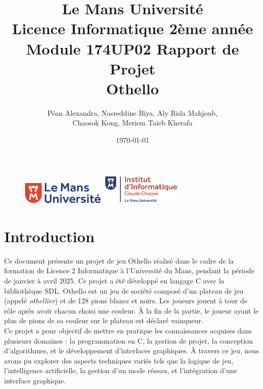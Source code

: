 \documentclass[12pt, a4paper, oneside]{article}
\begin{document}
\begin{figure}
    \includegraphics[width=4cm]{logolemansU.png}
    \hfill
    \includegraphics[width=4cm]{logo_IC2.png}
\end{figure}


\title{\color{blue}\textbf{Le Mans Université} \\
        \color{black} Licence Informatique 2ème année \\
       Module 174UP02 Rapport de Projet \\
       \textbf{Othello}}
\author{Péan Alexandra, Nasreddine Biya, Aly Rida Mahjoub, \\ Chaosok Kong, Meriem Taieb Kherafa}
\date{\today}

\maketitle

\newpage
\tableofcontents

\newpage

\section{Introduction}
   
Ce document présente un projet de jeu Othello réalisé dans le cadre de la 
    formation de Licence 2 Informatique à l’Université du Mans, pendant la 
    période de janvier à avril 2025. Ce projet a été développé en langage C avec 
    la bibliothèque SDL. Othello est un jeu de société composé d’un plateau de 
    jeu (appelé \textit{othellier}) et de 128 pions blancs et noirs. Les joueurs 
    jouent à tour de rôle après avoir chacun choisi une couleur. À la fin de la 
    partie, le joueur ayant le plus de pions de sa couleur sur le plateau est 
    déclaré vainqueur.\\

    Ce projet a pour objectif de mettre en pratique les connaissances acquises 
    dans plusieurs domaines : la programmation en C, la gestion de projet, la 
    conception d’algorithmes, et le développement d’interfaces graphiques. À 
    travers ce jeu, nous avons pu explorer des aspects techniques variés tels que 
    la logique de jeu, l’intelligence artificielle, la gestion d’un mode réseau, 
    et l’intégration d’une interface graphique. \\
\end{document}
